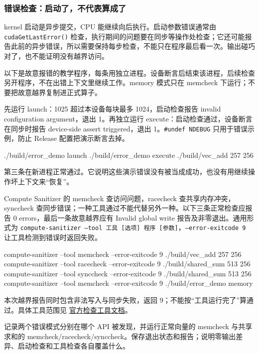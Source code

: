\subsubsection{错误检查：启动了，不代表算成了}
kernel 启动是异步提交，CPU 能继续向后执行。启动参数错误通常由 \texttt{cudaGetLastError()} 检查，执行期间的问题要在同步等操作处检查；它还可能报告此前的异步错误，所以需要保持每步检查，不能只在程序最后看一次。输出碰巧对了，也不能证明没有越界访问。
\begin{note}
以下是故意报错的教学程序，每条用独立进程。设备断言后结束该进程，后续检查另开程序，不在出错上下文里继续工作。memory 模式只在 memcheck 下运行；不要把故意越界复制进正式算子。
\end{note}
\begin{cudablock}

\end{cudablock}
\begin{example}[区分两处错误]
先运行 launch：1025 超过本设备每块最多 1024，启动检查报告 invalid configuration argument，退出 1。再独立运行 execute：启动检查通过，设备断言在同步时报告 device-side assert triggered，退出 1。\texttt{\#undef NDEBUG} 只用于错误示例，防止 Release 配置把演示断言去掉。
\begin{tbash}
./build/error_demo launch
./build/error_demo execute
./build/vec_add 257 256
\end{tbash}
第三条在新进程正常通过。它说明这些演示错误没有被当成成功，也没有用继续操作坏上下文来“恢复”。
\end{example}
\begin{example}[工具检查实际访问]
Compute Sanitizer 的 memcheck 查访问问题，racecheck 查共享内存冲突，synccheck 查同步错误；一种工具通过不能代替另外一种。以下三条正常检查应报告 0 errors，最后一条故意越界应有 Invalid global write 报告及非零退出。通用形式为 \texttt{compute-sanitizer --tool 工具 [选项] 程序 [参数]}，\texttt{--error-exitcode 9} 让工具检测到错误时返回失败。
\begin{tbash}
compute-sanitizer --tool memcheck --error-exitcode 9 ./build/vec_add 257 256
compute-sanitizer --tool racecheck --error-exitcode 9 ./build/shared_sum 513 256
compute-sanitizer --tool synccheck --error-exitcode 9 ./build/shared_sum 513 256
compute-sanitizer --tool memcheck --error-exitcode 9 ./build/error_demo memory
\end{tbash}
本次越界报告同时包含非法写入与同步失败，返回 9；不能按“工具运行完了”算通过。具体工具范围见 \href{https://docs.nvidia.com/compute-sanitizer/ComputeSanitizer/index.html}{官方检查工具文档}。
\end{example}
\begin{exercise}\label{ex:v2-cuda-error}
记录两个错误模式分别在哪个 API 被发现，并运行正常向量的 memcheck 与共享求和的 memcheck/racecheck/synccheck。保存退出状态和报告；说明零输出差异、启动检查和工具检查各自覆盖什么。
\end{exercise}

